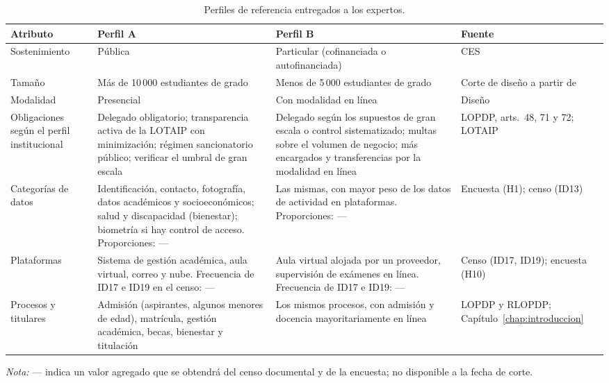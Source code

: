 \begin{table}[htbp]
  \centering
  \caption{Perfiles de referencia entregados a los expertos.}
  \label{tab:perfiles_referencia}
  \scriptsize
  \renewcommand{\arraystretch}{1.15}
  \begin{tabularx}{\textwidth}{|>{\raggedright\arraybackslash}p{2.4cm}|L|L|>{\raggedright\arraybackslash}p{2.6cm}|}
    \hline
    \textbf{Atributo} & \textbf{Perfil A} & \textbf{Perfil B} & \textbf{Fuente} \\
    \hline
    Sostenimiento & Pública & Particular (cofinanciada o autofinanciada) & CES \cite{ces2026sostenimiento} \\ \hline
    Tamaño & Más de 10\,000 estudiantes de grado & Menos de 5\,000 estudiantes de grado & Corte de diseño a partir de \cite{sumba2025economia} \\ \hline
    Modalidad & Presencial & Con modalidad en línea & Diseño \\ \hline
    Obligaciones según el perfil institucional & Delegado obligatorio; transparencia activa de la LOTAIP con minimización; régimen sancionatorio público; verificar el umbral de gran escala & Delegado según los supuestos de gran escala o control sistematizado; multas sobre el volumen de negocio; más encargados y transferencias por la modalidad en línea & LOPDP, arts.~48, 71 y 72; LOTAIP \\ \hline
    Categorías de datos & Identificación, contacto, fotografía, datos académicos y socioeconómicos; salud y discapacidad (bienestar); biometría si hay control de acceso. Proporciones: --- & Las mismas, con mayor peso de los datos de actividad en plataformas. Proporciones: --- & Encuesta (H1); censo (ID13) \\ \hline
    Plataformas & Sistema de gestión académica, aula virtual, correo y nube. Frecuencia de ID17 e ID19 en el censo: --- & Aula virtual alojada por un proveedor, supervisión de exámenes en línea. Frecuencia de ID17 e ID19: --- & Censo (ID17, ID19); encuesta (H10) \\ \hline
    Procesos y titulares & Admisión (aspirantes, algunos menores de edad), matrícula, gestión académica, becas, bienestar y titulación & Los mismos procesos, con admisión y docencia mayoritariamente en línea & LOPDP y RLOPDP; Capítulo~\ref{chap:introduccion} \\ \hline
  \end{tabularx}
  \par\vspace{2pt}
  \raggedright
  \textit{Nota:} --- indica un valor agregado que se obtendrá del censo documental y de la encuesta; no disponible a la fecha de corte.
  \par\vspace{2pt}
\end{table}

